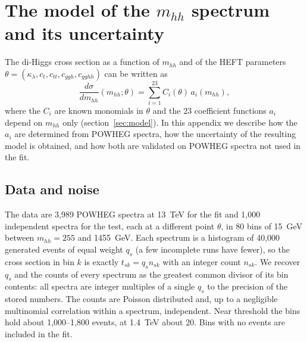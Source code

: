 \section{The model of the $m_{hh}$ spectrum and its uncertainty}
\label{app:model}

The di-Higgs cross section as a function of $m_{hh}$ and of the HEFT parameters
$\theta = (\kappa_\lambda, c_t, c_{tt}, c_{ggh}, c_{gghh})$ can be written
as~\cite{Alasfar:2023xpc}
\begin{equation}
  \frac{d\sigma}{dm_{hh}}(m_{hh};\theta) = \sum_{i=1}^{23} C_i(\theta)\, a_i(m_{hh}),
  \label{eq:app:form}
\end{equation}
where the $C_i$ are known monomials in $\theta$ and the 23 coefficient functions $a_i$ depend on
$m_{hh}$ only (section~\ref{sec:model}). %
In this appendix we describe how the $a_i$ are determined from POWHEG spectra, how the
uncertainty of the resulting model is obtained, and how both are validated on POWHEG spectra
not used in the fit.

\subsection{Data and noise}
\label{app:data}

The data are 3,989 POWHEG spectra at 13~TeV for the fit and 1,000 independent spectra for the
test, each at a different point $\theta$, in 80 bins of 15~GeV between $m_{hh} = 255$ and
1455~GeV. Each spectrum is a histogram of 40,000 generated events of equal weight $q_s$ (a few
incomplete runs have fewer), so the cross section in bin $k$ is exactly $t_{sk} = q_s n_{sk}$ with
an integer count $n_{sk}$. We recover $q_s$ and the counts of every spectrum as the greatest
common divisor of its bin contents: all spectra are integer multiples of a single $q_s$ to the
precision of the stored numbers. The counts are Poisson distributed and, up to a negligible
multinomial correlation within a spectrum, independent. Near threshold the bins hold about
1,000--1,800 events, at 1.4~TeV about 20. Bins with no events are included in the fit.

